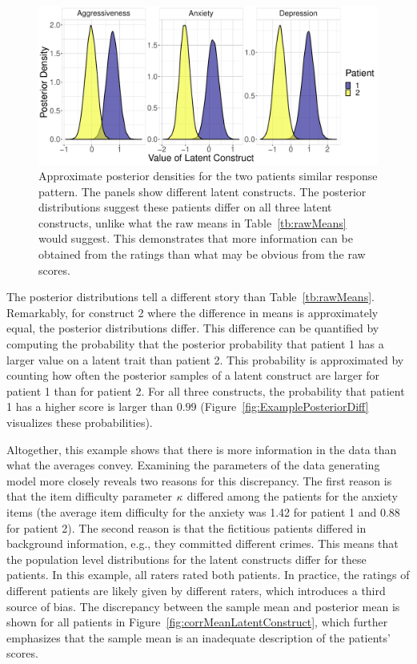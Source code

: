 \documentclass[a4paper]{article}
\begin{document}
\begin{figure}[!ht]
	\includegraphics[width=\textwidth]{figures/twoPatientsDensity.pdf}
	\caption{Approximate posterior densities for the two patients similar response pattern. The panels show different latent constructs. The posterior distributions suggest these patients differ on all three latent constructs, unlike what the raw means in Table~\ref{tb:rawMeans} would suggest. This demonstrates that more information can be obtained from the ratings than what may be obvious from the raw scores.}
	\label{fig:ExamplePosterior}
\end{figure}
The posterior distributions tell a different story than Table~\ref{tb:rawMeans}. Remarkably, for construct 2 where the difference in means is approximately equal, the posterior distributions differ. This difference can be quantified by computing the probability that the posterior probability that patient 1 has a larger value on a latent trait than patient 2. This probability is approximated by counting how often the posterior samples of a latent construct are larger for patient 1 than for patient 2. For all three constructs, the probability that patient 1 has a higher score is larger than $0.99$ (Figure~\ref{fig:ExamplePosteriorDiff} visualizes these probabilities).

Altogether, this example shows that there is more information in the data than what the averages convey. Examining the parameters of the data generating model more closely reveals two reasons for this discrepancy. The first reason is that the item difficulty parameter $\kappa$ differed among the patients for the anxiety items (the average item difficulty for the anxiety was 1.42 for patient 1 and 0.88 for patient 2). The second reason is that the fictitious patients differed in background information, e.g., they committed different crimes. This means that the population level distributions for the latent constructs differ for these patients. In this example, all raters rated both patients. In practice, the ratings of different patients are likely given by different raters, which introduces a third source of bias. The discrepancy between the sample mean and posterior mean is shown for all patients in Figure~\ref{fig:corrMeanLatentConstruct}, which further emphasizes that the sample mean is an inadequate description of the patients' scores.
\end{document}
